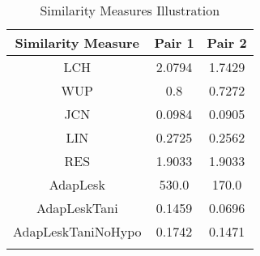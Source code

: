 \begin{center}
\begin{longtable}{| c | c | c |}  
\hline
\textbf{Similarity Measure} & \textbf{Pair 1} & \textbf{Pair 2} \\ \hline
LCH & 2.0794 & 1.7429 \\ \hline
WUP & 0.8 & 0.7272 \\ \hline
JCN & 0.0984 & 0.0905  \\ \hline
LIN & 0.2725 & 0.2562 \\ \hline
RES & 1.9033 & 1.9033 \\ \hline
AdapLesk & 530.0 & 170.0 \\ \hline
AdapLeskTani & 0.1459 & 0.0696 \\ \hline
AdapLeskTaniNoHypo & 0.1742 & 0.1471 \\ \hline
\caption{Similarity Measures Illustration}
\label{tab:similarityMeasuresIllustration}
\end{longtable}
\end{center}

\begin{comment}
1: 0 2.0794415416798357
1: 1 0.8
1: 2 0.0984253784312118
1: 3 0.27255086834319175
1: 4 1.9033026456664381
1: 5 530.0
1: 6 0.14593596059113303
1: 7 0.17427385892116182
------------------------------
1: 0 1.742969305058623
1: 1 0.7272727272727273
1: 2 0.09047925594509129
1: 3 0.2561841672684562
1: 4 1.9033026456664381
1: 5 170.0
1: 6 0.06958762886597938
1: 7 0.14709677419354839
\end{comment}

